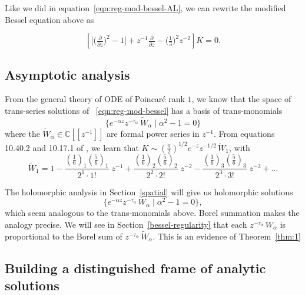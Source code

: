 \documentclass{article}
\newcommand{\C}{\mathbb{C}}
\newcommand{\series}[1]{\tilde{#1}}
\begin{document}
Like we did in equation~\ref{eqn:reg-mod-bessel-AL}, we can rewrite the modified Bessel equation above as 

\begin{equation}\label{eqn:reg-mod-bessel}
\left[ \big[ \big(\tfrac{\partial}{\partial z}\big)^2 - 1 \big] + z^{-1} \tfrac{\partial}{\partial z} - \big(\tfrac{1}{3}\big)^2 z^{-2} \right] K = 0.
\end{equation}

\subsection{Asymptotic analysis}
From the general theory of ODE of Poincar\'e rank $1$, we know that the space of trans-series solutions of ~\eqref{eqn:reg-mod-bessel} has a basis of trans-monomials
\[ \{ e^{-\alpha z} z^{-\tau_\alpha}\,\series{W}_\alpha \mid \alpha^2 - 1 = 0 \} \]
where the $\series{W}_\alpha\in\C[\![z^{-1}]\!]$ are formal power series in $z^{-1}$. From equations 10.40.2 and 10.17.1 of \cite{dlmf}, we learn that $K \sim \left(\tfrac{\pi}{2}\right)^{1/2} e^{-z} z^{-1/2}\,\series{W}_1$, with
\begin{equation}\label{bessel-asymp}
\series{W}_1 = 1 - \frac{(\tfrac{1}{6})_1 (\tfrac{5}{6})_1}{2^1 \cdot 1!}\;z^{-1} + \frac{(\tfrac{1}{6})_2 (\tfrac{5}{6})_2}{2^2 \cdot 2!}\;z^{-2} - \frac{(\tfrac{1}{6})_3 (\tfrac{5}{6})_3}{2^3 \cdot 3!}\;z^{-3} + \ldots
\end{equation}

The holomorphic analysis in Section~\ref{spatial} will give us holomorphic solutions
\[ \{ e^{-\alpha z} z^{-\tau_\alpha}\,W_\alpha \mid \alpha^2 - 1 = 0 \}, \]
which seem analogous to the trans-monomials above. Borel summation makes the analogy precise. We will see in Section~\ref{bessel-regularity} that each $z^{-\tau_\alpha}\,W_\alpha$ is proportional to the Borel sum of $z^{-\tau_\alpha}\,\series{W}_\alpha$. This is an evidence of Theorem~\ref{thm:1}

\subsection{Building a distinguished frame of analytic solutions}
\end{document}

